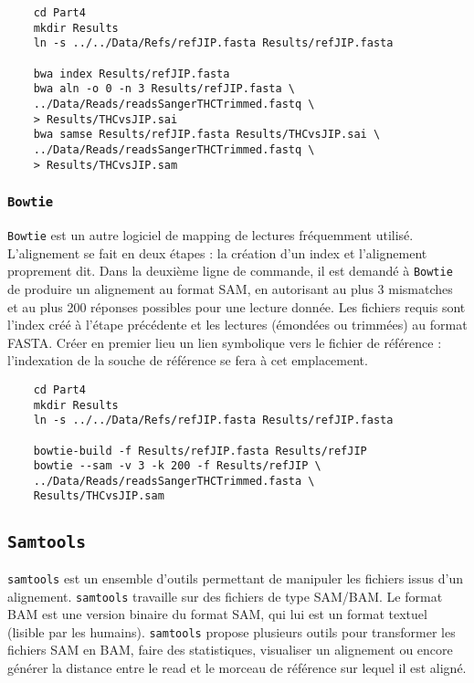 \documentclass[a4paper,12pt]{article}
\begin{document}
\begin{lstlisting}
	cd Part4
	mkdir Results
	ln -s ../../Data/Refs/refJIP.fasta Results/refJIP.fasta
	
	bwa index Results/refJIP.fasta
	bwa aln -o 0 -n 3 Results/refJIP.fasta \
	../Data/Reads/readsSangerTHCTrimmed.fastq \
	> Results/THCvsJIP.sai
	bwa samse Results/refJIP.fasta Results/THCvsJIP.sai \
	../Data/Reads/readsSangerTHCTrimmed.fastq \
	> Results/THCvsJIP.sam
\end{lstlisting}

\subsubsection{\tt{Bowtie}}
{\tt Bowtie} est un autre logiciel de mapping de lectures fréquemment utilisé. L'alignement se fait en deux étapes : la création d'un index et l'alignement proprement dit. Dans la deuxième ligne de commande, il est demandé à {\tt Bowtie} de produire un alignement au format SAM, en autorisant au plus 3 mismatches et au plus 200 réponses possibles pour une lecture donnée. Les fichiers requis sont l'index créé à l'étape précédente et les lectures (émondées ou trimmées) au format FASTA.
Créer en premier lieu un lien symbolique vers le fichier de référence : l'indexation de la souche de référence se fera à cet emplacement.

\begin{lstlisting}
	cd Part4
	mkdir Results
	ln -s ../../Data/Refs/refJIP.fasta Results/refJIP.fasta
	
	bowtie-build -f Results/refJIP.fasta Results/refJIP
	bowtie --sam -v 3 -k 200 -f Results/refJIP \
	../Data/Reads/readsSangerTHCTrimmed.fasta \
	Results/THCvsJIP.sam
\end{lstlisting}

\subsection{{\tt Samtools}}

{\tt samtools} est un ensemble d'outils permettant de manipuler les fichiers issus d'un alignement. {\tt samtools} travaille sur des fichiers de type SAM/BAM. Le format BAM est une version binaire du format SAM, qui lui est un format textuel (lisible par les humains). {\tt samtools} propose plusieurs outils pour transformer les fichiers SAM en BAM, faire des statistiques, visualiser un alignement ou encore générer la distance entre le read et le morceau de référence sur lequel il est aligné.
\end{document}
